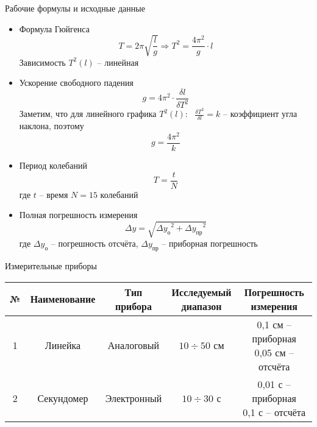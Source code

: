 \documentclass[12pt]{article}
\begin{document}
    \begin{point}{Рабочие формулы и исходные данные}
    \begin{itemize}
        \item Формула Гюйгенса
            \begin{equation}
                T = 2\pi \sqrt{\frac{l}{g}} \Rightarrow T^2 = \frac{4{\pi}^2}{g} \cdot l 
            \end{equation}
        Зависимость $T^2(l)$ -- линейная

        \item Ускорение свободного падения
            \begin{equation}
                g = 4{\pi}^2 \cdot \frac{\delta l}{\delta T^2}
            \end{equation}
        Заметим, что для линейного графика $T^2(l)$: \ $\frac{\delta T^2}{\delta l} = k$ -- коэффициент угла наклона, поэтому
            \begin{equation}
                g = \frac{4 {\pi}^2}{k}
            \end{equation}
        \item Период колебаний
            \begin{equation}
                T = \frac{t}{N}
            \end{equation}
            где $t$ -- время $N = 15$ колебаний
        \item Полная погрешность измерения
            \begin{equation}
                \Delta y = \sqrt{{\Delta y_{\text{о}}}^2 + {\Delta y_{\text{пр}}}^2}
            \end{equation}
        где $\Delta y_{\text{о}}$ -- погрешность отсчёта, $\Delta y_{\text{пр}}$ -- приборная погрешность
    \end{itemize}
    \end{point}
    
    \begin{point}{Измерительные приборы}
        \begin{center}
            \begin{tabular}{ |c|c|c|c|c| } 
                \hline
                № & Наименование & Тип прибора & \makecell{Исследуемый \\ диапазон} & \makecell{Погрешность \\ измерения} \\ 
                \hline
                1 & Линейка & Аналоговый & \(10 \div 50\) см & \makecell{0,1 см -- приборная \\ 0,05 см -- отсчёта} \\ 
                \hline
                2 & Секундомер & Электронный & \(10 \div 30\) с & \makecell{0,01 с -- приборная \\ 0,1 с -- отсчёта} \\ 
                \hline
            \end{tabular}
        \end{center}
    \end{point}
    
\end{document}
